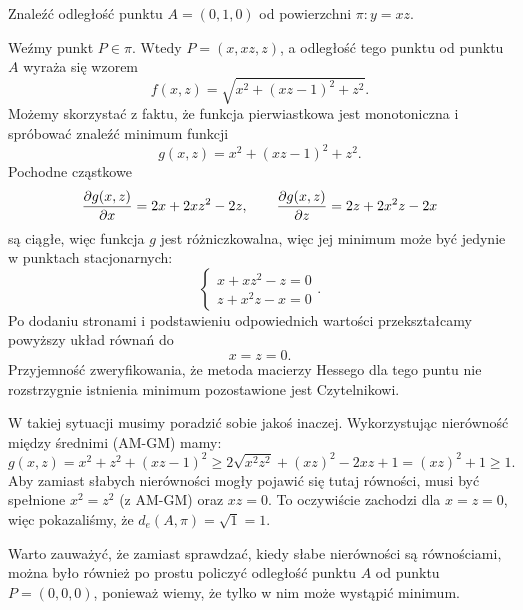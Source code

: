 \begin{example}
    Znaleźć odległość punktu $A = (0, 1, 0)$ od powierzchni $\pi : y = xz$.
\end{example}
\begin{solution}
    Weźmy punkt $P \in \pi$. Wtedy $P = (x, xz, z)$, a odległość tego punktu od punktu $A$ wyraża się wzorem
    \[ f(x, z) = \sqrt{x^2 + (xz- 1)^2 + z^2}. \]
    Możemy skorzystać z faktu, że funkcja pierwiastkowa jest monotoniczna i spróbować znaleźć minimum funkcji
    \[ g(x, z) = x^2 + (xz - 1)^2 + z^2. \]
    Pochodne cząstkowe
    \[ \frac{\operatorname{\partial}\!{g}(x, z)}{\operatorname{\partial}\!{x}} = 2x + 2xz^2 - 2z, \qquad \frac{\operatorname{\partial}\!{g}(x, z)}{\operatorname{\partial}\!{z}} = 2z + 2x^2z - 2x \]
    są ciągłe, więc funkcja $g$ jest różniczkowalna, więc jej minimum może być jedynie w punktach stacjonarnych:
    \[ \begin{cases} x + xz^2 - z = 0 \\ z + x^2z - x = 0 \end{cases}. \]
    Po dodaniu stronami i podstawieniu odpowiednich wartości przekształcamy powyższy układ równań do
    \[ x = z = 0. \]
    Przyjemność zweryfikowania, że metoda macierzy Hessego dla tego puntu nie rozstrzygnie istnienia minimum pozostawione jest Czytelnikowi.

    W takiej sytuacji musimy poradzić sobie jakoś inaczej. Wykorzystując nierówność między średnimi (AM-GM) mamy:
    \[ g(x, z) = x^2 + z^2 + (xz - 1)^2 \geq 2\sqrt{x^2z^2} + (xz)^2 - 2xz + 1 = (xz)^2 + 1 \geq 1. \]
    Aby zamiast słabych nierówności mogły pojawić się tutaj równości, musi być spełnione $x^2 = z^2$ (z AM-GM) oraz $xz = 0$. To oczywiście zachodzi dla $x = z = 0$, więc pokazaliśmy, że $d_e(A, \pi) = \sqrt{1} = 1$.
\end{solution}

Warto zauważyć, że zamiast sprawdzać, kiedy słabe nierówności są równościami, można było również po prostu policzyć odległość punktu $A$ od punktu $P = (0, 0, 0)$, ponieważ wiemy, że tylko w nim może wystąpić minimum.